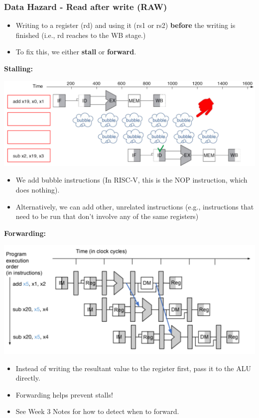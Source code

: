 \documentclass[10pt]{article}
\begin{document}
\subsubsection*{Data Hazard - Read after write (RAW)}
\begin{itemize}
    \item Writing to a register (rd) and using it (rs1 or rs2) \textbf{before} the writing is finished (i.e., rd reaches to the WB stage.)
    \item To fix this, we either \textbf{stall} or \textbf{forward}.
\end{itemize}
\textbf{Stalling:}
\begin{center}
    \includegraphics*[scale=0.6]{W3_9.png}
\end{center}
\begin{itemize}
    \item We add bubble instructions (In RISC-V, this is the NOP instruction, which does nothing).
    \item Alternatively, we can add other, unrelated instructions (e.g., instructions that need to be run that don't involve any of the same registers)
\end{itemize}
\textbf{Forwarding:}
\begin{center}
    \includegraphics*[scale=0.6]{W3_11.png}
\end{center}
\begin{itemize}
    \item Instead of writing the resultant value to the register first, pass it to the ALU directly.
    \item Forwarding helps prevent stalls!
    \item See Week 3 Notes for how to detect when to forward.
\end{itemize}
\end{document}
